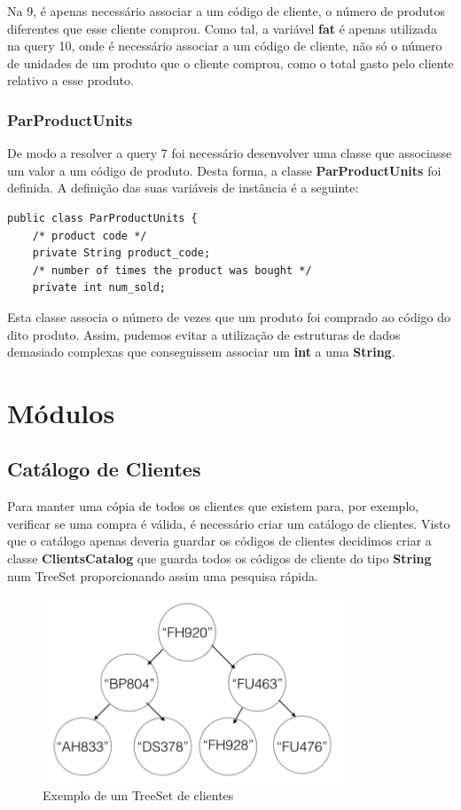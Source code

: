 \documentclass[10pt] {article}
\begin{document}
Na  9, é apenas necessário associar a um código de cliente, o número de produtos diferentes que esse cliente comprou.
Como tal, a variável \textbf{fat} é apenas utilizada na query 10, onde é necessário associar a um código de cliente, não só o número de unidades de um produto que o cliente comprou, como o total gasto pelo cliente relativo a esse produto.

\subsubsection{ParProductUnits}

De modo a resolver a query 7 foi necessário desenvolver uma classe que associasse um valor a um código de produto.
Desta forma, a classe \textbf{ParProductUnits} foi definida. A definição das suas variáveis de instância é a seguinte:

\begin{lstlisting}
public class ParProductUnits {
	/* product code */
    private String product_code;
    /* number of times the product was bought */
    private int num_sold;
\end{lstlisting}


Esta classe associa o número de vezes que um produto foi comprado ao código do dito produto.
Assim, pudemos evitar a utilização de estruturas de dados demasiado complexas que conseguissem associar um \textbf{int} a uma \textbf{String}.

\newpage
\section{Módulos}
\subsection{Catálogo de Clientes}

Para manter uma cópia de todos os clientes que existem para, por exemplo, verificar se uma compra é válida, é necessário
criar um catálogo de clientes.
Visto que o catálogo apenas deveria guardar os códigos de clientes decidimos criar a classe \textbf{ClientsCatalog} que guarda todos os códigos de cliente do tipo \textbf{String} num TreeSet proporcionando assim uma pesquisa rápida.

\begin{figure}[ht!]
\centering
\includegraphics[width=90mm]{catclientes.png}
\caption{Exemplo de um TreeSet de clientes}
\end{figure}
\end{document}
